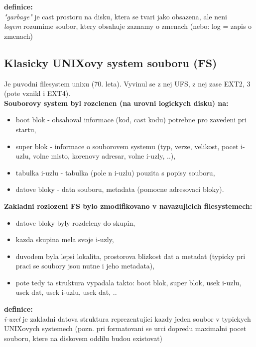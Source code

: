 \documentclass[a4paper, 11pt]{article}
\begin{document}
\textbf{definice:} \\[0.5em]
\textit{"garbage"} je cast prostoru na disku, ktera se tvari jako obsazena, ale neni \\[0.2em]
\textit{logem} rozumime soubor, ktery obsahuje zaznamy o zmenach (nebo: log = zapis o zmenach) \\

\newpage

\subsection{Klasicky UNIXovy system souboru (FS)}
Je puvodni filesystem unixu (70. leta). Vyvinul se z nej UFS, z nej zase EXT2, 3 (pote vznikl i EXT4). \\

\textbf{Souborovy system byl rozclenen (na urovni logickych disku) na:}
\begin{itemize}
    \item boot blok - obsahoval informace (kod, cast kodu) potrebne pro zavedeni pri startu,
    \item super blok - informace o souborovem systemu (typ, verze, velikost, pocet i-uzlu, volne misto, korenovy adresar, volne i-uzly, ..),
    \item tabulka i-uzlu - tabulka (pole n i-uzlu) pouzita s popisy souboru,
    \item datove bloky - data souboru, metadata (pomocne adresovaci bloky). \\
\end{itemize}

\textbf{Zakladni rozlozeni FS bylo zmodifikovano v navazujicich filesystemech:}
\begin{itemize}
    \item datove bloky byly rozdeleny do skupin, 
    \item kazda skupina mela svoje i-uzly,
    \item duvodem byla lepsi lokalita, prostorova blizkost dat a metadat (typicky pri praci se soubory jsou nutne i jeho metadata),
    \item pote tedy ta struktura vypadala takto: boot blok, super blok, usek i-uzlu, usek dat, usek i-uzlu, usek dat, .. \\
\end{itemize}

\textbf{definice:} \\[0.5em]
\textit{i-uzel} je zakladni datova struktura reprezentujici kazdy jeden soubor v typickych UNIXovych systemech (pozn. pri formatovani se urci dopredu maximalni pocet souboru, ktere na diskovem oddilu budou existovat) \\
\end{document}
